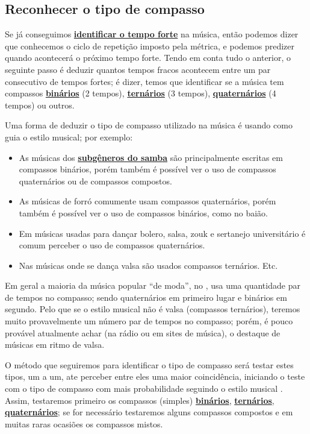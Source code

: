 \subsection{Reconhecer o tipo de compasso}
\label{subsec:pertipodecompasso}
Se já conseguimos \hyperref[subsec:perceberTF1]{\textbf{identificar o tempo forte}} na música,
então podemos dizer que conhecemos o ciclo de repetição imposto pela métrica,
e podemos predizer quando acontecerá o próximo tempo forte.
Tendo em conta tudo o anterior,
o seguinte passo é deduzir quantos tempos fracos acontecem 
entre um par consecutivo de tempos fortes;
é dizer, 
temos que identificar se a música tem compassos 
\hyperref[subsec:compassobinario]{\textbf{binários}} (2 tempos), 
\hyperref[subsec:compassoternario]{\textbf{ternários}} (3 tempos), 
\hyperref[subsec:compassoquaternario]{\textbf{quaternários}} (4 tempos) 
ou outros. 

Uma forma de deduzir o tipo de compasso utilizado na música  é usando como guia o estilo musical; por exemplo:
\begin{itemize}
\item As músicas dos \hyperref[sec:FamiliaSamba]{\textbf{subgêneros do samba}} 
são principalmente escritas em compassos binários,
porém também é possível ver o uso de compassos quaternários ou de compassos compostos.
\item As músicas de forró comumente usam compassos quaternários,
porém também é possível ver o uso de compassos binários, como no baião. 
\item Em músicas usadas para dançar bolero, salsa, zouk 
e sertanejo universitário é comum perceber o uso de compassos quaternários.
\item Nas músicas onde se dança valsa são usados compassos ternários. Etc.
\end{itemize}
Em geral a maioria da música popular ``de moda'', no \AnoLivro, usa uma quantidade par de tempos no compasso;
sendo quaternários em primeiro lugar e binários em segundo.
Pelo que se o estilo musical não é valsa (compassos ternários), 
teremos muito provavelmente um número par de tempos no compasso;
porém, é  pouco provável atualmente achar (na rádio ou em sites de música),
o destaque de músicas em ritmo de valsa.

O método que seguiremos para identificar o tipo de compasso será testar estes tipos,
um a um, ate perceber entre eles uma maior coincidência,
iniciando o teste com o tipo de compasso com mais probabilidade seguindo o estilo musical \cite[pp. 10]{wright1992social}.
Assim, testaremos primeiro os compassos (simples)
\hyperref[subsec:compassobinario]{\textbf{binários}}, 
\hyperref[subsec:compassoternario]{\textbf{ternários}}, 
\hyperref[subsec:compassoquaternario]{\textbf{quaternários}};
se for necessário testaremos alguns compassos compostos 
e em muitas raras ocasiões os compassos mistos.

